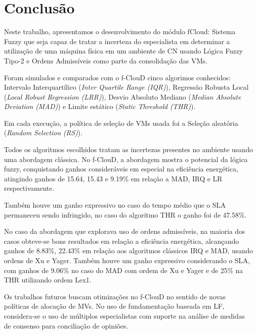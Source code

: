\documentclass[tcc,capa]{texufpel}
\begin{document}
\chapter{Conclusão} \label{capConclusao}

Neste trabalho, apresentamos o desenvolvimento do módulo fCloud: Sistema Fuzzy que seja capaz de tratar a incerteza do especialista em determinar a utilização de uma máquina física em um ambiente de CN usando Lógica Fuzzy Tipo-2 e Ordens Admissíveis como parte da consolidação das VMs. 

Foram simulados e comparados com o f-ClouD cinco algorimos conhecidos: Intervalo Interquartílico (\emph{Inter Quartile Range (IQR)}), Regressão Robusta Local (\emph{Local Robust Regression (LRR)}), Desvio Absoluto Mediano (\emph{Median Absolute Deviation (MAD)}) e Limite estático (\emph{Static Threshold (THR)}). 

Em cada execução, a política de seleção de VMs usada foi a Seleção aleatória (\emph{Random Selection (RS)}). 

Todos os algoritmos escolhidos tratam as incertezas presentes no ambiente usando uma abordagem clássica. No f-ClouD, a abordagem  mostra o potencial da lógica fuzzy, conquistando ganhos consideráveis em especial na eficiência energética, atingindo ganhos de 15.64, 15.43 e 9.19\% em relação a MAD, IRQ e LR respectivamente. 

Também houve um ganho expressivo no caso do tempo médio que o SLA permaneceu sendo infringido, no caso do algoritmo THR o ganho foi de 47.58\%.

No caso da abordagem que explorava uso de ordens admissíveis, na maioria dos casos obteve-se bons resultados em relação a eficiência energética, alcançando ganhos de 8.83\%, 22.43\% em relação aos algoritmos clássicos IRQ e MAD, usando ordens de Xu e Yager. Também houve um ganho expressivo considerando o SLA, com ganhos de 9.06\% no caso do MAD com ordem de Xu e Yager e de 25\% na THR utilizando ordem Lex1.

Os trabalhos futuros buscam otimizações no f-ClouD no sentido de novas políticas de alocação de MVs. No uso de fundamentação baseada em LF, considera-se o uso de múltiplos especialistas com suporte na análise de medidas de consenso para conciliação de opiniões. 






 

%
\end{document}
